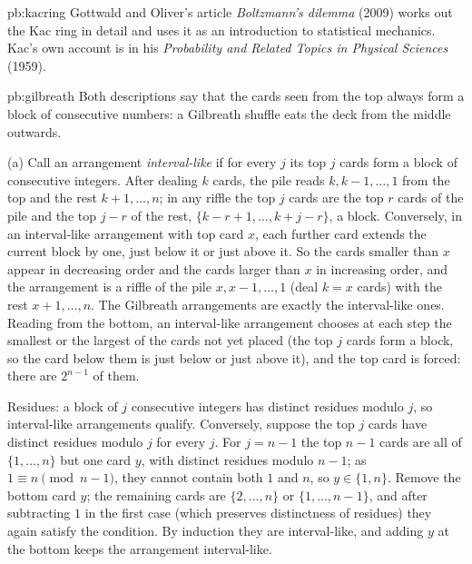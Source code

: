 \begin{solution}{pb:kacring}
\leads Gottwald and Oliver's article \emph{Boltzmann's dilemma} (2009) works out the Kac ring in detail and uses it as an introduction to
statistical mechanics. Kac's own account is in his \emph{Probability and Related Topics in Physical Sciences} (1959).
\end{solution}

\begin{solution}{pb:gilbreath}
\idea Both descriptions say that the cards seen from the top always form a block of consecutive numbers: a Gilbreath shuffle eats the
deck from the middle outwards.

\writeup (a) Call an arrangement \emph{interval-like} if for every $j$ its top $j$ cards form a block of consecutive integers. After dealing $k$ cards, the
pile reads $k,k-1,\dots,1$ from the top and the rest $k+1,\dots,n$; in any riffle the top $j$ cards are the top $r$ cards of the pile and the top $j-r$
of the rest, $\{k-r+1,\dots,k+j-r\}$, a block. Conversely, in an interval-like arrangement with top card $x$, each further card extends the current
block by one, just below it or just above it. So the cards smaller than $x$ appear in decreasing order and the cards larger than $x$ in increasing
order, and the arrangement is a riffle of the pile $x,x-1,\dots,1$ (deal $k=x$ cards) with the rest $x+1,\dots,n$. The Gilbreath arrangements are exactly the
interval-like ones. Reading from the bottom, an interval-like arrangement chooses at each step the smallest or the largest of the cards not yet
placed (the top $j$ cards form a block, so the card below them is just below or just above it), and the top card is forced: there are $2^{n-1}$ of
them.

Residues: a block of $j$ consecutive integers has distinct residues modulo $j$, so interval-like arrangements qualify. Conversely, suppose the top $j$ cards
have distinct residues modulo $j$ for every $j$. For $j=n-1$ the top $n-1$ cards are all of $\{1,\dots,n\}$ but one card $y$, with distinct residues modulo
$n-1$; as $1\equiv n\pmod{n-1}$, they cannot contain both $1$ and $n$, so $y\in\{1,n\}$. Remove the bottom card $y$; the remaining cards are $\{2,\dots,n\}$ or $\{1,\dots,n-1\}$,
and after subtracting $1$ in the first case (which preserves distinctness of residues) they again satisfy the condition. By induction they
are interval-like, and adding $y$ at the bottom keeps the arrangement interval-like.


\end{solution}
